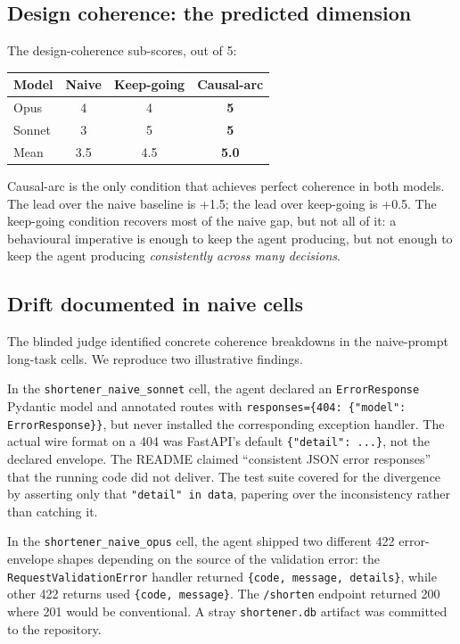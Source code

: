 \documentclass[11pt]{article}
\begin{document}
\subsection{Design coherence: the predicted dimension}

The design-coherence sub-scores, out of 5:

\begin{center}
\begin{tabular}{lccc}
\toprule
Model  & Naive & Keep-going & Causal-arc \\
\midrule
Opus   & 4 & 4 & \textbf{5} \\
Sonnet & 3 & 5 & \textbf{5} \\
\midrule
Mean   & 3.5 & 4.5 & \textbf{5.0} \\
\bottomrule
\end{tabular}
\end{center}

\noindent Causal-arc is the only condition that achieves perfect coherence
in both models. The lead over the naive baseline is +1.5; the lead over
keep-going is +0.5. The keep-going condition recovers most of the naive
gap, but not all of it: a behavioural imperative is enough to keep the
agent producing, but not enough to keep the agent producing
\emph{consistently across many decisions}.

\subsection{Drift documented in naive cells}

The blinded judge identified concrete coherence breakdowns in the
naive-prompt long-task cells. We reproduce two illustrative findings.

In the \texttt{shortener\_naive\_sonnet} cell, the agent declared an
\texttt{ErrorResponse} Pydantic model and annotated routes with
\texttt{responses=\{404: \{"model": ErrorResponse\}\}}, but never installed
the corresponding exception handler. The actual wire format on a 404 was
FastAPI's default \texttt{\{"detail": ...\}}, not the declared envelope.
The README claimed ``consistent JSON error responses'' that the running
code did not deliver. The test suite covered for the divergence by
asserting only that \texttt{"detail" in data}, papering over the
inconsistency rather than catching it.

In the \texttt{shortener\_naive\_opus} cell, the agent shipped two
different 422 error-envelope shapes depending on the source of the
validation error: the \texttt{RequestValidationError} handler returned
\texttt{\{code, message, details\}}, while other 422 returns used
\texttt{\{code, message\}}. The \texttt{/shorten} endpoint returned 200
where 201 would be conventional. A stray \texttt{shortener.db} artifact
was committed to the repository.
\end{document}
